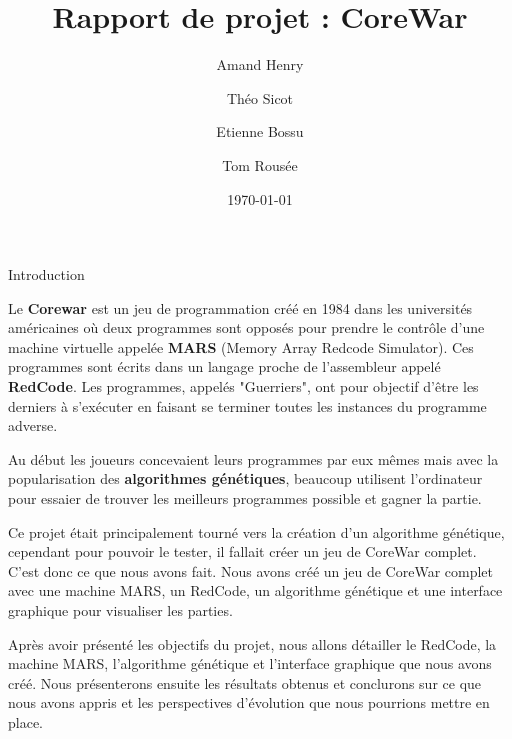 \documentclass[a4paper, 10pt]{article}
\title{Rapport de projet : CoreWar}
\author{Amand Henry\and{}Théo Sicot\and{}Etienne Bossu\and{}Tom Rousée}
\date{\today{}}
\begin{document}
    \maketitle{}
    \newpage{}
    \tableofcontents{}
    \newpage{}

    \begin{section}{Introduction} \label{sec:introduction}
        \par
            Le \textbf{Corewar} est un jeu de programmation créé en 1984 dans les universités américaines où deux programmes sont opposés pour prendre le contrôle d'une machine virtuelle appelée \textbf{MARS} (Memory Array Redcode Simulator). Ces programmes sont écrits dans un langage proche de l'assembleur appelé \textbf{RedCode}. Les programmes, appelés "Guerriers", ont pour objectif d'être les derniers à s'exécuter en faisant se terminer toutes les instances du programme adverse.
            \medskip
        \par
            Au début les joueurs concevaient leurs programmes par eux mêmes mais avec la popularisation des \textbf{algorithmes génétiques}, beaucoup utilisent l'ordinateur pour essaier de trouver les meilleurs programmes possible et gagner la partie.
            \medskip
        \par
            Ce projet était principalement tourné vers la création d'un algorithme génétique, cependant pour pouvoir le tester, il fallait créer un jeu de CoreWar complet. C'est donc ce que nous avons fait. Nous avons créé un jeu de CoreWar complet avec une machine MARS, un RedCode, un algorithme génétique et une interface graphique pour visualiser les parties.
            \medskip
        \par
            Après avoir présenté les objectifs du projet, nous allons détailler le RedCode, la machine MARS, l'algorithme génétique et l'interface graphique que nous avons créé. Nous présenterons ensuite les résultats obtenus et conclurons sur ce que nous avons appris et les perspectives d'évolution que nous pourrions mettre en place.
            \bigskip


\end{section}
\end{document}
